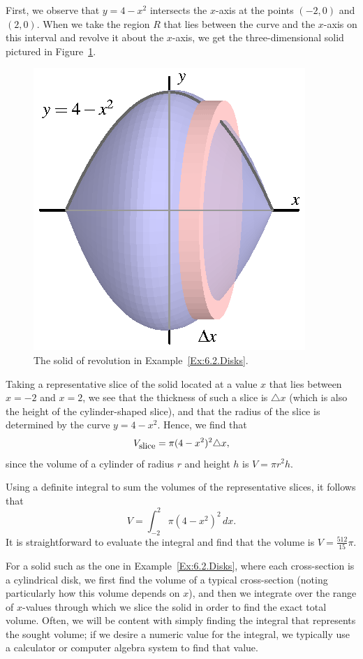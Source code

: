 First, we observe that $y = 4-x^2$ intersects the $x$-axis at the points $(-2,0)$ and $(2,0)$.  When we take the region $R$  that lies between the curve and the $x$-axis on this interval and revolve it about the $x$-axis, we get the three-dimensional solid pictured in Figure~\ref{F:6.2.Ex1}.

\begin{figure}[h]
\begin{center}
\includegraphics{figures/6_2_Ex1.eps}
\caption{The solid of revolution in Example~\ref{Ex:6.2.Disks}.} \label{F:6.2.Ex1}
\end{center}
\end{figure}

Taking a representative slice of the solid located at a value $x$ that lies between $x = -2$ and $x = 2$, we see that the thickness of such a slice is $\triangle x$ (which is also the height of the cylinder-shaped slice), and that the radius of the slice is determined by the curve $y = 4-x^2$.  Hence, we find that 
$$V_{\text{\small{slice}}} = \pi (4-x^2)^2 \triangle x,$$
since the volume of a cylinder of radius $r$ and height $h$ is $V = \pi r^2 h$.

Using a definite integral to sum the volumes of the representative slices, it follows that 
$$V = \int_{-2}^{2} \pi (4-x^2)^2 \, dx.$$
It is straightforward to evaluate the integral and find that the volume is $V = \frac{512}{15}\pi$.

\afterex

For a solid such as the one in Example~\ref{Ex:6.2.Disks}, where each cross-section is a cylindrical disk, we first find the volume of a typical cross-section (noting particularly how this volume depends on $x$), and then we integrate over the range of $x$-values through which we slice the solid in order to find the exact total volume.  Often, we will be content with simply finding the integral that represents the sought volume; if we desire a numeric value for the integral, we typically use a calculator or computer algebra system to find that value.

